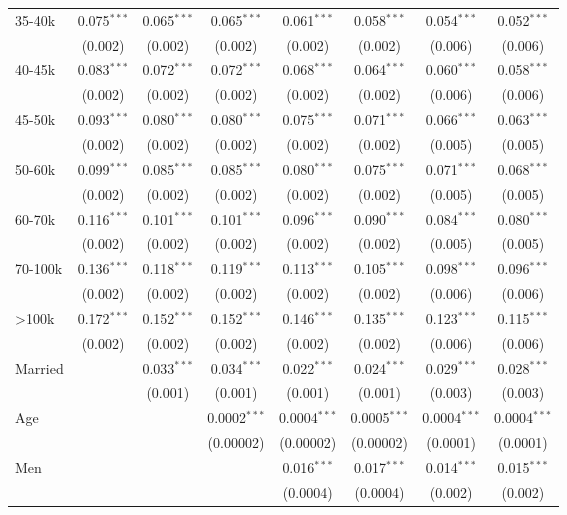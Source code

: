 \begin{table}[!htbp]
{\begin{tabular}{@{\extracolsep{5pt}}lccccccc}
  35-40k & 0.075$^{***}$ & 0.065$^{***}$ & 0.065$^{***}$ & 0.061$^{***}$ & 0.058$^{***}$ & 0.054$^{***}$ & 0.052$^{***}$ \\
  & (0.002) & (0.002) & (0.002) & (0.002) & (0.002) & (0.006) & (0.006) \\
  40-45k & 0.083$^{***}$ & 0.072$^{***}$ & 0.072$^{***}$ & 0.068$^{***}$ & 0.064$^{***}$ & 0.060$^{***}$ & 0.058$^{***}$ \\
  & (0.002) & (0.002) & (0.002) & (0.002) & (0.002) & (0.006) & (0.006) \\
  45-50k & 0.093$^{***}$ & 0.080$^{***}$ & 0.080$^{***}$ & 0.075$^{***}$ & 0.071$^{***}$ & 0.066$^{***}$ & 0.063$^{***}$ \\
  & (0.002) & (0.002) & (0.002) & (0.002) & (0.002) & (0.005) & (0.005) \\
  50-60k & 0.099$^{***}$ & 0.085$^{***}$ & 0.085$^{***}$ & 0.080$^{***}$ & 0.075$^{***}$ & 0.071$^{***}$ & 0.068$^{***}$ \\
  & (0.002) & (0.002) & (0.002) & (0.002) & (0.002) & (0.005) & (0.005) \\
  60-70k & 0.116$^{***}$ & 0.101$^{***}$ & 0.101$^{***}$ & 0.096$^{***}$ & 0.090$^{***}$ & 0.084$^{***}$ & 0.080$^{***}$ \\
  & (0.002) & (0.002) & (0.002) & (0.002) & (0.002) & (0.005) & (0.005) \\
  70-100k & 0.136$^{***}$ & 0.118$^{***}$ & 0.119$^{***}$ & 0.113$^{***}$ & 0.105$^{***}$ & 0.098$^{***}$ & 0.096$^{***}$ \\
  & (0.002) & (0.002) & (0.002) & (0.002) & (0.002) & (0.006) & (0.006) \\
  >100k & 0.172$^{***}$ & 0.152$^{***}$ & 0.152$^{***}$ & 0.146$^{***}$ & 0.135$^{***}$ & 0.123$^{***}$ & 0.115$^{***}$ \\
  & (0.002) & (0.002) & (0.002) & (0.002) & (0.002) & (0.006) & (0.006) \\
  Married &  & 0.033$^{***}$ & 0.034$^{***}$ & 0.022$^{***}$ & 0.024$^{***}$ & 0.029$^{***}$ & 0.028$^{***}$ \\
  &  & (0.001) & (0.001) & (0.001) & (0.001) & (0.003) & (0.003) \\
  Age &  &  & 0.0002$^{***}$ & 0.0004$^{***}$ & 0.0005$^{***}$ & 0.0004$^{***}$ & 0.0004$^{***}$ \\
  &  &  & (0.00002) & (0.00002) & (0.00002) & (0.0001) & (0.0001) \\
  Men &  &  &  & 0.016$^{***}$ & 0.017$^{***}$ & 0.014$^{***}$ & 0.015$^{***}$ \\
  &  &  &  & (0.0004) & (0.0004) & (0.002) & (0.002) \\

\end{tabular}}
\end{table}
